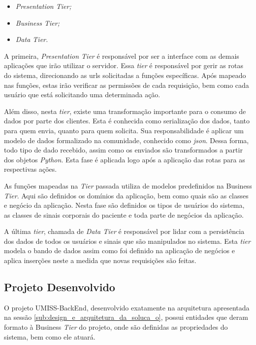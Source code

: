 \begin{itemize}
    \item \textit{Presentation Tier;}
    \item \textit{Business Tier;}
    \item \textit{Data Tier.}
\end{itemize}

A primeira, \textit{Presentation Tier} é responsável por ser a interface com as demais aplicações
que irão utilizar o servidor. Essa \textit{tier} é responsável por gerir as rotas do sistema, direcionando
as urls solicitadas a funções específicas. Após mapeado nas funções, estas irão verificar as permissões
de cada requisição, bem como cada usuário que está solicitando uma determinada ação.

Além disso, nesta \textit{tier}, existe uma transformação importante para o consumo de dados por parte dos clientes.
Esta é conhecida como serialização dos dados, tanto para quem envia, quanto para quem solicita.
Sua responsabilidade é aplicar um modelo de dados formalizado na comunidade, conhecido como \textit{json}.
Dessa forma, todo tipo de dado recebido, assim como os enviados são transformados  a partir
dos objetos \textit{Python}. Esta fase é aplicada logo após a aplicação das rotas para as respectivas
ações.

As funções mapeadas na \textit{Tier} passada utiliza de modelos predefinidos na Business \textit{Tier}.
Aqui são definidos os domínios da aplicação, bem como quais são as classes e negócio da
aplicação. Nesta fase são definidos os tipos de usuários do sistema, as classes de sinais
corporais do paciente e toda parte  de negócios da aplicação.

A última \textit{tier}, chamada de \textit{Data Tier} é responsável por lidar com a persistência dos dados
de todos os usuários e sinais que são manipulados no sistema. Esta  \textit{tier}  modela o
bando de dados assim como foi definido na aplicação de negócios e aplica
inserções neste a medida que novas requisições são feitas.

\subsection{Projeto Desenvolvido}
\label{sub:projetodesenvolvido}

O projeto UMISS-BackEnd, desenvolvido exatamente na arquitetura apresentada na sessão
\ref{sub:design_e_arquitetura_da_soluca_o}, possui entidades que deram formato à Business
\textit{Tier} do projeto, onde são definidas as propriedades do sistema, bem como ele atuará.

